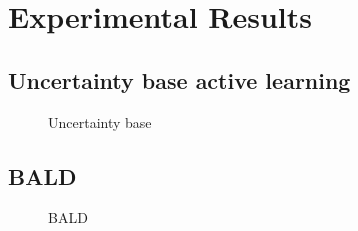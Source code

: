 \section{Experimental Results}

\label{sec:experimentalResults}
\subsection{Uncertainty base active learning}
\begin{figure}[!htb]%
    \centering
    \qquad
    \caption{Uncertainty base}%
    \label{fig:uncertainty1}%
\end{figure}
\subsection{BALD}

\begin{figure}[!htb]%
    \centering
    \qquad
    \caption{BALD}%
    \label{fig:BALD}%
\end{figure}
